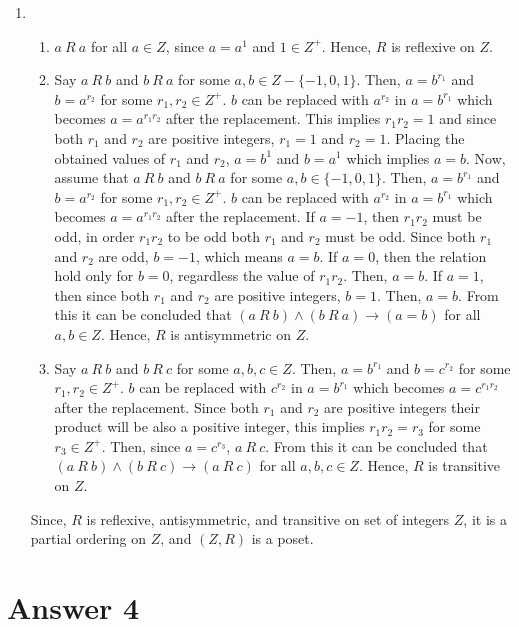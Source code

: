 \documentclass[12pt]{article}
\begin{document}
\begin{enumerate}
    \item
    \begin{enumerate}
        \item $a \ R \ a$ for all $a \in Z$, since $a = a^1$ and $1 \in Z^+$. Hence, $R$ is reflexive on $Z$.
        \item Say $a \ R \ b$ and $b \ R \ a$ for some $a, b \in Z - \{-1, 0, 1\}$. Then, $a = b^{r_1}$ and $b = a^{r_2}$ for some $r_1, r_2 \in Z^+$. $b$ can be replaced with $a^{r_2}$ in $a = b^{r_1}$ which becomes $a = a^{r_1r_2}$ after the replacement. This implies $r_1r_2 = 1$ and since both $r_1$ and $r_2$ are positive integers, $r_1 = 1$ and $r_2 = 1$. Placing the obtained values of $r_1$ and $r_2$, $a = b^1$ and $b = a^1$ which implies $a = b$. Now, assume that $a \ R \ b$ and $b \ R \ a$ for some $a, b \in \{-1, 0, 1\}$. Then, $a = b^{r_1}$ and $b = a^{r_2}$ for some $r_1, r_2 \in Z^+$. $b$ can be replaced with $a^{r_2}$ in $a = b^{r_1}$ which becomes $a = a^{r_1r_2}$ after the replacement. If $a = -1$, then $r_1r_2$ must be odd, in order $r_1r_2$ to be odd both $r_1$ and $r_2$ must be odd. Since both $r_1$ and $r_2$ are odd, $b = -1$, which means $a = b$. If $a = 0$, then the relation hold only for $b = 0$, regardless the value of $r_1r_2$. Then, $a = b$. If $a = 1$, then since both $r_1$ and $r_2$ are positive integers, $b = 1$. Then, $a = b$. From this it can be concluded that $(a \ R \ b) \land (b \ R \ a) \rightarrow (a = b)$ for all $a, b \in Z$. Hence, $R$ is antisymmetric on $Z$.
        \item Say $a \ R \ b$ and $b \ R \ c$ for some $a, b, c \in Z$. Then, $a = b^{r_1}$ and $b = c^{r_2}$ for some $r_1, r_2 \in Z^+$. $b$ can be replaced with $c^{r_2}$ in $a = b^{r_1}$ which becomes $a = c^{r_1r_2}$ after the replacement. Since both $r_1$ and $r_2$ are positive integers their product will be also a positive integer, this implies $r_1r_2 = r_3$ for some $r_3 \in Z^+$. Then, since $a = c^{r_3}$, $a \ R \ c$. From this it can be concluded that $(a \ R \ b) \land (b \ R \ c) \rightarrow (a \ R \ c)$ for all $a, b, c \in Z$. Hence, $R$ is transitive on $Z$.
    \end{enumerate}
    Since, $R$ is reflexive, antisymmetric, and transitive on set of integers $Z$, it is a partial ordering on $Z$, and $(Z, R)$ is a poset.
    
\end{enumerate}


\section*{Answer 4}
\end{document}
